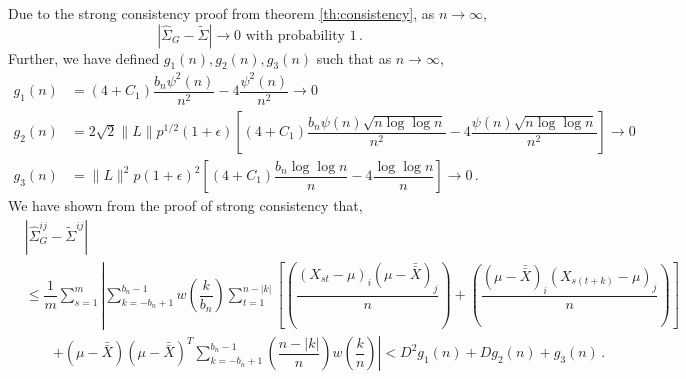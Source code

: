 \documentclass[11pt]{article}
\theoremstyle{remark}
\begin{document}
 Due to the strong consistency proof from theorem \ref{th:consistency}, as $n \to \infty$,
\begin{equation}
\label{eq:G-SVE_asv_consis}
 \left|\hat{\Sigma}_{G} -  \tilde{\Sigma}\right| \to 0 \text{ with probability 1}\,. 
\end{equation}
Further, we have defined $g_1(n), g_2(n), g_3(n)$ such that as $n \to \infty$,
\begin{align*}
    g_1(n) &= (4+C_1)\dfrac{b_n \psi^2(n)}{n^2} - 4\dfrac{\psi^2(n)}{n^2} \to 0\\
    g_2(n) &= 2\sqrt{2}\|L\|p^{1/2}(1+\epsilon)\left[(4+C_1)\dfrac{b_n\psi(n)\sqrt{n\log \log n}}{n^2} - 4\dfrac{\psi(n)\sqrt{n\log \log n}}{n^2}\right] \to 0\\
    g_3(n) &= \|L\|^2 p (1+\epsilon)^2\left[(4+C_1)\dfrac{b_n \log\log n}{n} - 4 \dfrac{\log \log n}{n}\right] \to 0\,.
\end{align*}
%
We have shown from the proof of strong consistency that,
\begin{align*}
 &\left| \hat{\Sigma}_{G}^{ij} - \tilde{\Sigma}^{ij} \right|\\
 & \leq \dfrac{1}{m} \sum_{s=1}^m \left| \sum_{k=-b_n+1}^{b_n-1} w \left(\dfrac{k}{b_n} \right) \sum_{t=1}^{n-|k|}   \left[ \left( \dfrac{(X_{st} - \mu)_i(\mu-\bar{\bar{X}})_j}{n}\right)+ \left(\dfrac{(\mu-\bar{\bar{X}})_i(X_{s(t+k)}-\mu)_j}{n}\right) \right] \right.\\
& \quad \quad  \left. + (\mu-\bar{\bar{X}})(\mu-\bar{\bar{X}})^T\sum_{k=-b_n+1}^{b_n-1}\left(\dfrac{n-|k|}{n}\right)w\left(\dfrac{k}{n}\right) \right|  < D^2g_1(n) + Dg_2(n) + g_3(n)\,.
\end{align*}
\end{document}
